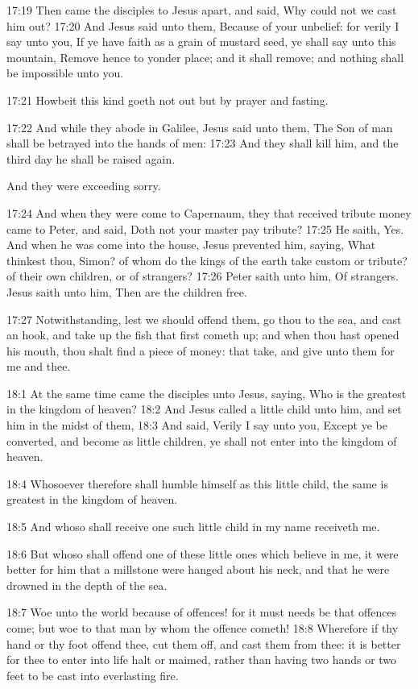 17:19 Then came the disciples to Jesus apart, and said, Why could not
we cast him out?  17:20 And Jesus said unto them, Because of your
unbelief: for verily I say unto you, If ye have faith as a grain of
mustard seed, ye shall say unto this mountain, Remove hence to yonder
place; and it shall remove; and nothing shall be impossible unto you.

17:21 Howbeit this kind goeth not out but by prayer and fasting.

17:22 And while they abode in Galilee, Jesus said unto them, The Son
of man shall be betrayed into the hands of men: 17:23 And they shall
kill him, and the third day he shall be raised again.

And they were exceeding sorry.

17:24 And when they were come to Capernaum, they that received tribute
money came to Peter, and said, Doth not your master pay tribute?
17:25 He saith, Yes. And when he was come into the house, Jesus
prevented him, saying, What thinkest thou, Simon? of whom do the kings
of the earth take custom or tribute? of their own children, or of
strangers?  17:26 Peter saith unto him, Of strangers. Jesus saith unto
him, Then are the children free.

17:27 Notwithstanding, lest we should offend them, go thou to the sea,
and cast an hook, and take up the fish that first cometh up; and when
thou hast opened his mouth, thou shalt find a piece of money: that
take, and give unto them for me and thee.

18:1 At the same time came the disciples unto Jesus, saying, Who is
the greatest in the kingdom of heaven?  18:2 And Jesus called a little
child unto him, and set him in the midst of them, 18:3 And said,
Verily I say unto you, Except ye be converted, and become as little
children, ye shall not enter into the kingdom of heaven.

18:4 Whosoever therefore shall humble himself as this little child,
the same is greatest in the kingdom of heaven.

18:5 And whoso shall receive one such little child in my name
receiveth me.

18:6 But whoso shall offend one of these little ones which believe in
me, it were better for him that a millstone were hanged about his
neck, and that he were drowned in the depth of the sea.

18:7 Woe unto the world because of offences! for it must needs be that
offences come; but woe to that man by whom the offence cometh!  18:8
Wherefore if thy hand or thy foot offend thee, cut them off, and cast
them from thee: it is better for thee to enter into life halt or
maimed, rather than having two hands or two feet to be cast into
everlasting fire.

